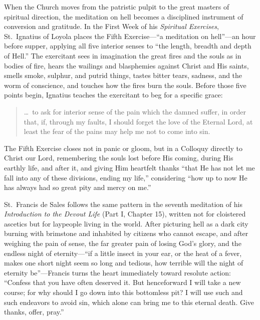 When the Church moves from the patristic pulpit to the great masters of spiritual direction, the meditation on hell becomes a disciplined instrument of conversion and gratitude. In the First Week of his \textit{Spiritual Exercises}, St.\ Ignatius of Loyola places the Fifth Exercise---``a meditation on hell''---an hour before supper, applying all five interior senses to ``the length, breadth and depth of Hell.'' The exercitant sees in imagination the great fires and the souls as in bodies of fire, hears the wailings and blasphemies against Christ and His saints, smells smoke, sulphur, and putrid things, tastes bitter tears, sadness, and the worm of conscience, and touches how the fires burn the souls. Before those five points begin, Ignatius teaches the exercitant to beg for a specific grace:

\begin{quote}
\dots\ to ask for interior sense of the pain which the damned suffer, in order that, if, through my faults, I should forget the love of the Eternal Lord, at least the fear of the pains may help me not to come into sin.
\end{quote}

The Fifth Exercise closes not in panic or gloom, but in a Colloquy directly to Christ our Lord, remembering the souls lost before His coming, during His earthly life, and after it, and giving Him heartfelt thanks ``that He has not let me fall into any of these divisions, ending my life,'' considering ``how up to now He has always had so great pity and mercy on me.''

St.\ Francis de Sales follows the same pattern in the seventh meditation of his \textit{Introduction to the Devout Life} (Part I, Chapter 15), written not for cloistered ascetics but for laypeople living in the world. After picturing hell as a dark city burning with brimstone and inhabited by citizens who cannot escape, and after weighing the pain of sense, the far greater pain of losing God's glory, and the endless night of eternity---``if a little insect in your ear, or the heat of a fever, makes one short night seem so long and tedious, how terrible will the night of eternity be''---Francis turns the heart immediately toward resolute action: ``Confess that you have often deserved it. But henceforward I will take a new course; for why should I go down into this bottomless pit? I will use such and such endeavors to avoid sin, which alone can bring me to this eternal death. Give thanks, offer, pray.''

